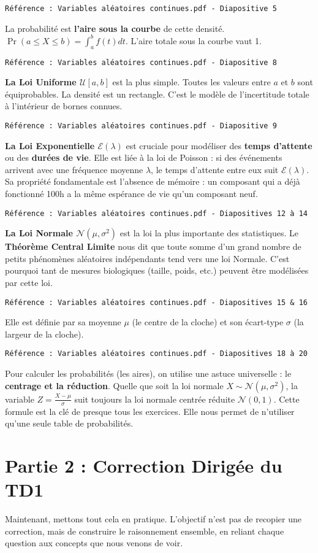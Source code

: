 \documentclass[12pt, a4paper]{article}
\newcommand{\slidenote}[1]{%
    \par\vspace{1.5ex}%
    \noindent\texttt{\small\color{gray}#1}\par\nopagebreak\vspace{1.5ex}%
}
\begin{document}
\slidenote{Référence : Variables aléatoires continues.pdf - Diapositive 5}
La probabilité est \textbf{l'aire sous la courbe} de cette densité. $\Pr(a \le X \le b) = \int_a^b f(t)dt$. L'aire totale sous la courbe vaut 1.

\slidenote{Référence : Variables aléatoires continues.pdf - Diapositive 8}
\textbf{La Loi Uniforme $\mathcal{U}[a, b]$} est la plus simple. Toutes les valeurs entre $a$ et $b$ sont équiprobables. La densité est un rectangle. C'est le modèle de l'incertitude totale à l'intérieur de bornes connues.

\slidenote{Référence : Variables aléatoires continues.pdf - Diapositive 9}
\textbf{La Loi Exponentielle $\mathcal{E}(\lambda)$} est cruciale pour modéliser des \textbf{temps d'attente} ou des \textbf{durées de vie}. Elle est liée à la loi de Poisson : si des événements arrivent avec une fréquence moyenne $\lambda$, le temps d'attente entre eux suit $\mathcal{E}(\lambda)$. Sa propriété fondamentale est l'absence de mémoire : un composant qui a déjà fonctionné 100h a la même espérance de vie qu'un composant neuf.

\slidenote{Référence : Variables aléatoires continues.pdf - Diapositives 12 à 14}
\textbf{La Loi Normale $\mathcal{N}(\mu, \sigma^2)$} est la loi la plus importante des statistiques. Le \textbf{Théorème Central Limite} nous dit que toute somme d'un grand nombre de petits phénomènes aléatoires indépendants tend vers une loi Normale. C'est pourquoi tant de mesures biologiques (taille, poids, etc.) peuvent être modélisées par cette loi.

\slidenote{Référence : Variables aléatoires continues.pdf - Diapositives 15 \& 16}
Elle est définie par sa moyenne $\mu$ (le centre de la cloche) et son écart-type $\sigma$ (la largeur de la cloche).

\slidenote{Référence : Variables aléatoires continues.pdf - Diapositives 18 à 20}
Pour calculer les probabilités (les aires), on utilise une astuce universelle : le \textbf{centrage et la réduction}. Quelle que soit la loi normale $X \sim \mathcal{N}(\mu, \sigma^2)$, la variable $Z = \frac{X-\mu}{\sigma}$ suit toujours la loi normale centrée réduite $\mathcal{N}(0, 1)$. Cette formule est la clé de presque tous les exercices. Elle nous permet de n'utiliser qu'une seule table de probabilités.

\section*{Partie 2 : Correction Dirigée du TD1}
Maintenant, mettons tout cela en pratique. L'objectif n'est pas de recopier une correction, mais de construire le raisonnement ensemble, en reliant chaque question aux concepts que nous venons de voir.
\end{document}

